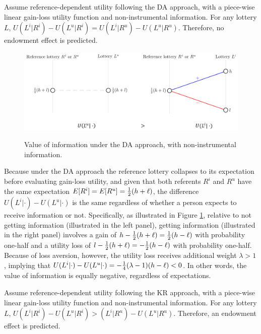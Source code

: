 \begin{prop}
  Assume reference-dependent utility following the DA approach, with a piece-wise linear gain-loss utility function and non-instrumental information. For any lottery $L$, $U(L^i|R^i)-U(L^u|R^i)=U(L^i|R^u)-U(L^u|R^u)$. Therefore, no endowment effect is predicted.
  \label{prop:nonInstrumental-DA}
\end{prop}

\begin{figure}[ht]
  \caption{Value of information under the DA approach, with non-instrumental information.}\label{fig:nonInstrumental-DA}
  \begin{center}
  {\includegraphics[width=1\textwidth]{./figures/theory_fig1.png}}
  \end{center}
\end{figure}

Because under the DA approach the reference lottery collapses to its expectation before evaluating gain-loss utility, and given that both referents $R^i$ and $R^u$ have the same expectation $E[R^i]=E[R^u]=\tfrac{1}{2}(h+\ell)$, the difference $U(L^i|\cdot)-U(L^u|\cdot)$ is the same regardless of whether a person expects to receive information or not. Specifically, as illustrated in Figure \ref{fig:nonInstrumental-DA}, relative to not getting information (illustrated in the left panel), getting information (illustrated in the right panel) involves a gain of $h-\tfrac{1}{2}(h+\ell)=\tfrac{1}{2}(h-\ell)$ with probability one-half and a utility loss of $l-\tfrac{1}{2}(h+\ell)=-\tfrac{1}{2}(h-\ell)$ with probability one-half. Because of loss aversion, however, the utility loss receives additional weight $\lambda>1$, implying that $U(L^i|\cdot)-U(L^u|\cdot)=-\tfrac{1}{4}(\lambda-1)(h-\ell)<0$. In other words, the value of information is equally negative, regardless of expectations.

\FloatBarrier

\begin{prop}
  Assume reference-dependent utility following the KR approach, with a piece-wise linear gain-loss utility function and non-instrumental information. For any lottery $L$, $U(L^i|R^i)-U(L^u|R^i)>(L^i|R^u)-U(L^u|R^u)$. Therefore, an endowment effect is predicted.
  \label{prop:nonInstrumental-KR}
\end{prop}

